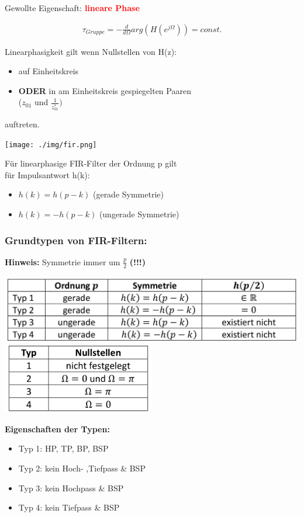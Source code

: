 \documentclass[10pt,a4paper]{article}
\begin{document}
\begin{minipage}{0.5\textwidth} 
Gewollte Eigenschaft: \textbf{\textcolor{red}{lineare Phase}}
  \begin{mdframed}[style=exercise]
    \begin{align}
        \tau_{Gruppe} = -\frac{d}{d\Omega} arg(H(e^{j\Omega})) = const.
    \end{align}
  \end{mdframed}
Linearphasigkeit gilt wenn Nullstellen von H(z):
\begin{itemize}
    \item auf Einheitskreis
    \item \textbf{ODER} in am Einheitskreis gespiegelten Paaren\\
    ($z_{01}$ und $\frac{1}{z^*_{01}})$
\end{itemize}
auftreten.
  \begin{center}
      \texttt{[image: ./img/fir.png]}
  \end{center}
Für linearphasige FIR-Filter der Ordnung p gilt\\
für Impulsantwort h(k):
\begin{itemize}
    \item $h(k)= h(p-k)$ (gerade Symmetrie) 
    \item $h(k)= -h(p-k)$ (ungerade Symmetrie)\\
\end{itemize}
\end{minipage}
\begin{minipage}{0.5\textwidth} 
\subsubsection{Grundtypen von FIR-Filtern:}
\textbf{Hinweis: } Symmetrie immer um $\frac{p}{2}$ \textbf{(!!!)}
\begin{center}
      \includegraphics[width=1\textwidth]{./img/Grundtypen_FIR.png}
      \includegraphics[width=0.5\textwidth]{./img/Grundtypen_FIR_NST.png}
\end{center}
\textbf{Eigenschaften der Typen:}
\begin{itemize}
	\item Typ 1: HP, TP, BP, BSP
	\item Typ 2: kein Hoch- ,Tiefpass \& BSP
	\item Typ 3: kein Hochpass \& BSP
	\item Typ 4: kein Tiefpass \& BSP
\end{itemize}
\end{minipage}
\end{document}
